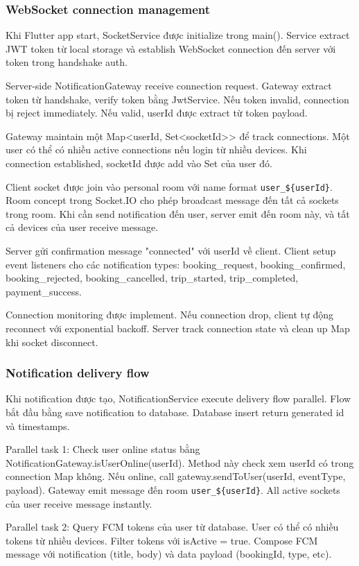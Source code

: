 \subsubsection{WebSocket connection management}
Khi Flutter app start, SocketService được initialize trong main(). Service extract JWT token từ local storage và establish WebSocket connection đến server với token trong handshake auth.

Server-side NotificationGateway receive connection request. Gateway extract token từ handshake, verify token bằng JwtService. Nếu token invalid, connection bị reject immediately. Nếu valid, userId được extract từ token payload.

Gateway maintain một Map<userId, Set<socketId>> để track connections. Một user có thể có nhiều active connections nếu login từ nhiều devices. Khi connection established, socketId được add vào Set của user đó.

Client socket được join vào personal room với name format \texttt{user\_\$\{userId\}}. Room concept trong Socket.IO cho phép broadcast message đến tất cả sockets trong room. Khi cần send notification đến user, server emit đến room này, và tất cả devices của user receive message.

Server gửi confirmation message "connected" với userId về client. Client setup event listeners cho các notification types: booking\_request, booking\_confirmed, booking\_rejected, booking\_cancelled, trip\_started, trip\_completed, payment\_success.

Connection monitoring được implement. Nếu connection drop, client tự động reconnect với exponential backoff. Server track connection state và clean up Map khi socket disconnect.

\subsubsection{Notification delivery flow}
Khi notification được tạo, NotificationService execute delivery flow parallel. Flow bắt đầu bằng save notification to database. Database insert return generated id và timestamps.

Parallel task 1: Check user online status bằng NotificationGateway.isUserOnline(userId). Method này check xem userId có trong connection Map không. 
Nếu online, call gateway.sendToUser(userId, eventType, payload). Gateway emit message đến room \texttt{user\_\$\{userId\}}. 
All active sockets của user receive message instantly.

Parallel task 2: Query FCM tokens của user từ database. User có thể có nhiều tokens từ nhiều devices. 
Filter tokens với isActive = true. Compose FCM message với notification (title, body) và data payload (bookingId, type, etc).

